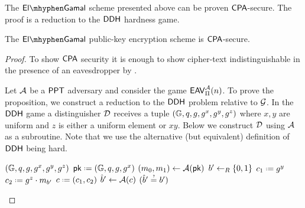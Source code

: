The $\elGamal$ scheme presented above can be proven $\mathsf{CPA}$-secure. The proof is a reduction to the $\mathsf{DDH}$ hardness game. 

\begin{prop}
The $\elGamal$ public-key encryption scheme is $\mathsf{CPA}$-secure.  
\end{prop}

\begin{proof}
To show $\mathsf{CPA}$ security it is enough to show cipher-text indistinguishable in the presence of an eavesdropper by . 

Let $\mathcal{A}$ be a $\mathsf{PPT}$ adversary and consider the game $\mathsf{EAV}_{\operatorname{\Pi}}^{\mathcal{A}}(n)$. To prove the proposition, we construct a reduction to the $\mathsf{DDH}$ problem relative to $\operatorname{\mathcal{G}}$. In the $\mathsf{DDH}$ game a distinguisher $\dist$ receives a tuple $(\mathbb{G},q,g,g^x,g^y,g^z)$ where  $x,y$ are uniform and $z$ is either a uniform element or $xy$. Below we construct $\dist$ using $\mathcal{A}$ as a subroutine. Note that we use the alternative (but equivalent) definition of $\mathsf{DDH}$ being hard. 



\begin{Algorithm}[]{6cm}
\captionDistinguisher
\caption{$\dist$}
\label{alg:distElgamal}
\begin{algorithmic}[1]
\Require $(\mathbb{G},q,g,g^x,g^y,g^z)$ 
\State $\pk \defeq (\cgroup,q,g,g^x)$ 
\State $(m_0,m_1)\leftarrow\mathcal{A}(\mathsf{pk})$
\State $b'\leftarrow_R\{0,1\}$
\State $c_1\defeq g^y$
\State $c_2\defeq g^z\cdot m_{b'}$
\State $c \defeq (c_1,c_2)$
\State $\hat{b}'\leftarrow\mathcal{A}(c)$
\State \Ret $\askequal{\hat{b}'}{b'}$
\end{algorithmic}
\end{Algorithm}


\end{proof}
